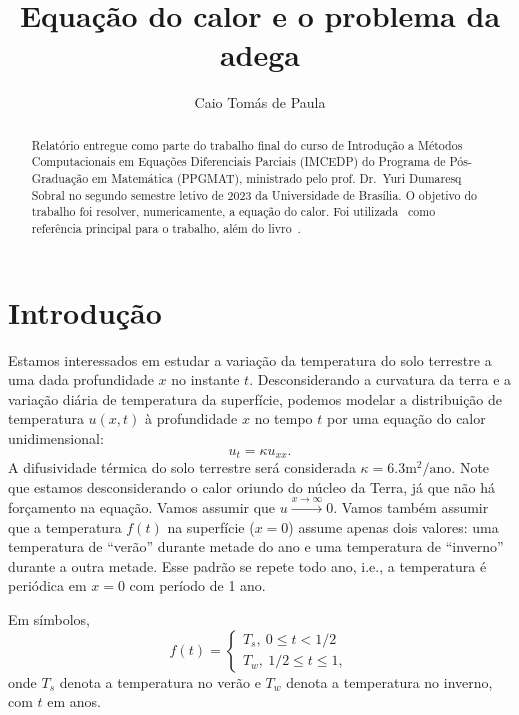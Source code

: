 \documentclass[twocolumn,showpacs,%
  nofootinbib,aps,superscriptaddress,%
  eqsecnum,prd,notitlepage,showkeys,10pt]{revtex4-1}
\renewcommand{\leq}{\leqslant}
\begin{document}
\title{
  Equação do calor e o problema da adega
}
\author{Caio Tomás de Paula}
%
\begin{abstract}
    Relatório entregue como parte do trabalho final do curso de Introdução a
    Métodos Computacionais em Equações Diferenciais Parciais (IMCEDP) do
    Programa de Pós-Graduação em Matemática (PPGMAT),
    ministrado pelo prof. Dr.~Yuri Dumaresq Sobral no segundo semestre letivo
    de 2023 da Universidade de Brasília.
    O objetivo do trabalho foi resolver, numericamente, a equação do calor.
    Foi utilizada~\cite{Sturm-Liouville} como referência principal para o trabalho, além
    do livro~\cite{iserles2008}.
\end{abstract}
%
\maketitle
%
\section{Introdução}
%
	Estamos interessados em estudar a variação da temperatura do solo terrestre a uma dada
	profundidade $x$ no instante $t$. Desconsiderando a curvatura da terra e a variação diária
	de temperatura da superfície, podemos modelar a distribuição de temperatura $u(x,t)$ à
	profundidade $x$ no tempo $t$ por uma equação do calor unidimensional:
	\begin{equation*}
		u_t = \kappa u_{xx}.
	\end{equation*}
	A difusividade térmica do solo terrestre será considerada $\kappa = 6.3\text{m}^2/\text{ano}$.
	Note que estamos desconsiderando o calor oriundo do núcleo da Terra, já que não há forçamento
	na equação. Vamos assumir que $u \xrightarrow{x\to\infty} 0$. Vamos também assumir que
	a temperatura $f(t)$ na superfície ($x = 0$) assume apenas dois valores: uma temperatura
	de ``verão'' durante metade do ano e uma temperatura de ``inverno'' durante a outra metade.
	Esse padrão se repete todo ano, i.e., a temperatura é periódica em $x=0$ com período de 1 ano.

	Em símbolos,
	\begin{equation*}
		f(t) = \begin{cases}
			T_s, \ 0 \leq t < 1/2 \\
			T_w, \ 1/2 \leq t \leq 1,
		\end{cases}
	\end{equation*}
	onde $T_s$ denota a temperatura no verão e $T_w$ denota a temperatura no inverno, com $t$ em anos.
\end{document}
